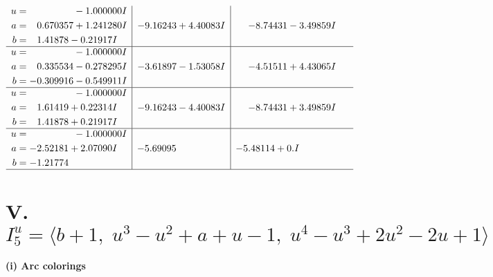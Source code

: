 \documentclass[1p]{elsarticle_modified}
\theoremstyle{definition}
\begin{document}
$$\begin{array}{c|c|c}
\begin{aligned}
u &= \phantom{-0.000000 } -1.000000 I \\
a &= \phantom{-}0.670357 + 1.241280 I \\
b &= \phantom{-}1.41878 - 0.21917 I\end{aligned}
 & -9.16243 + 4.40083 I & -8.74431 - 3.49859 I \\ \hline\begin{aligned}
u &= \phantom{-0.000000 } -1.000000 I \\
a &= \phantom{-}0.335534 - 0.278295 I \\
b &= -0.309916 - 0.549911 I\end{aligned}
 & -3.61897 - 1.53058 I & -4.51511 + 4.43065 I \\ \hline\begin{aligned}
u &= \phantom{-0.000000 } -1.000000 I \\
a &= \phantom{-}1.61419 + 0.22314 I \\
b &= \phantom{-}1.41878 + 0.21917 I\end{aligned}
 & -9.16243 - 4.40083 I & -8.74431 + 3.49859 I \\ \hline\begin{aligned}
u &= \phantom{-0.000000 } -1.000000 I \\
a &= -2.52181 + 2.07090 I \\
b &= -1.21774\phantom{ +0.000000I}\end{aligned}
 & -5.69095\phantom{ +0.000000I} & -5.48114 + 0. I\phantom{ +0.000000I}\\
 \hline 
 \end{array}$$\newpage\newpage\renewcommand{\arraystretch}{1}
\centering \section*{V. $I^u_{5}= \langle b+1,\;u^3- u^2+a+u-1,\;u^4- u^3+2 u^2-2 u+1 \rangle$}
\flushleft \textbf{(i) Arc colorings}\\
\end{document}
